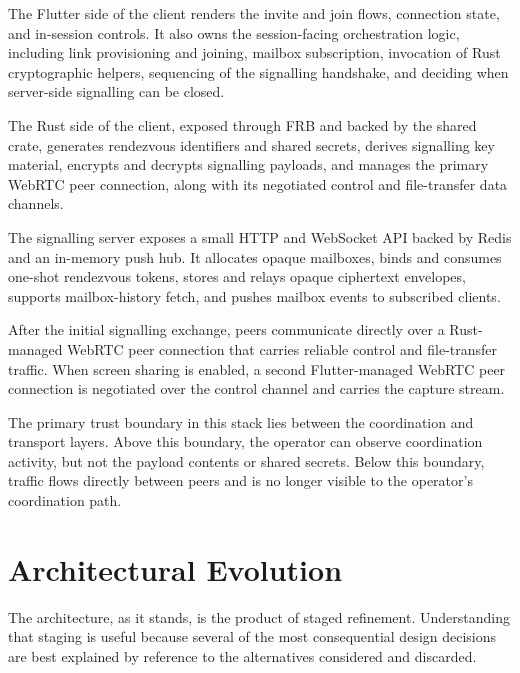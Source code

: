 \documentclass[12pt,a4paper,oneside]{report}
\begin{document}
\begin{description}[style=nextline]
  \item[Client Application layer] The Flutter side of the client renders the invite and join flows, connection state, and in-session controls. It also owns the session-facing orchestration logic, including link provisioning and joining, mailbox subscription, invocation of Rust cryptographic helpers, sequencing of the signalling handshake, and deciding when server-side signalling can be closed.

  \item[Client Core layer] The Rust side of the client, exposed through FRB and backed by the shared crate, generates rendezvous identifiers and shared secrets, derives signalling key material, encrypts and decrypts signalling payloads, and manages the primary WebRTC peer connection, along with its negotiated control and file-transfer data channels.

  \item[Coordination layer] The signalling server exposes a small HTTP and WebSocket API backed by Redis and an in-memory push hub. It allocates opaque mailboxes, binds and consumes one-shot rendezvous tokens, stores and relays opaque ciphertext envelopes, supports mailbox-history fetch, and pushes mailbox events to subscribed clients.

  \item[Transport layer] After the initial signalling exchange, peers communicate directly over a Rust-managed WebRTC peer connection that carries reliable control and file-transfer traffic. When screen sharing is enabled, a second Flutter-managed WebRTC peer connection is negotiated over the control channel and carries the capture stream.
\end{description}

The primary trust boundary in this stack lies between the coordination and transport layers. Above this boundary, the operator can observe coordination activity, but not the payload contents or shared secrets. Below this boundary, traffic flows directly between peers and is no longer visible to the operator's coordination path.


\section{Architectural Evolution}
\label{sec:arch-evolution}

The architecture, as it stands, is the product of staged refinement. Understanding that staging is useful because several of the most consequential design decisions are best explained by reference to the alternatives considered and discarded.
\end{document}
